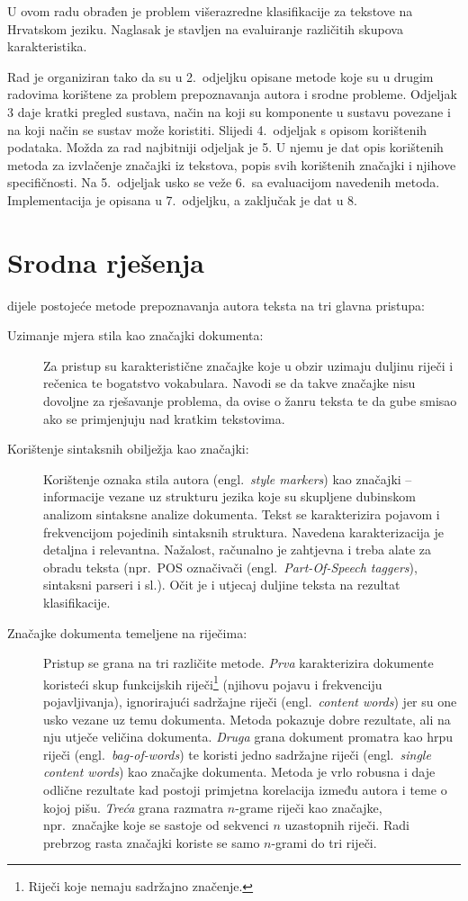 \documentclass{article}
\newcommand{\engl}[1]{(engl.~\emph{#1})}
\begin{document}
U ovom radu obrađen je problem višerazredne klasifikacije za tekstove na
Hrvatskom jeziku. Naglasak je stavljen na evaluiranje različitih skupova
karakteristika.

Rad je organiziran tako da su u 2.~odjeljku opisane metode koje su u drugim
radovima korištene za problem prepoznavanja autora i srodne probleme. Odjeljak 3
daje kratki pregled sustava, način na koji su komponente u sustavu povezane i na
koji način se sustav može koristiti. Slijedi 4.~odjeljak s opisom korištenih
podataka. Možda za rad najbitniji odjeljak je 5. U njemu je dat opis korištenih
metoda za izvlačenje značajki iz tekstova, popis svih korištenih značajki i
njihove specifičnosti. Na 5.~odjeljak usko se veže 6.~sa evaluacijom navedenih
metoda. Implementacija je opisana u 7.~odjeljku, a zaključak je dat u 8.
 
\section{Srodna rješenja}
\citet{coyotl2006authorship} dijele postojeće metode prepoznavanja autora
teksta na tri glavna pristupa:
\begin{description}
\item[Uzimanje mjera stila kao značajki dokumenta:] Za pristup su
karakteristične značajke koje u obzir uzimaju duljinu riječi i rečenica te
bogatstvo vokabulara. Navodi se da takve značajke nisu dovoljne za rješavanje
problema, da ovise o žanru teksta te da gube smisao ako se primjenjuju nad
kratkim tekstovima.
\item[Korištenje sintaksnih obilježja kao značajki:] Korištenje oznaka stila
autora \engl{style markers} kao značajki -- informacije vezane uz strukturu
jezika koje su skupljene dubinskom analizom sintaksne analize dokumenta. Tekst se
karakterizira pojavom i frekvencijom pojedinih sintaksnih struktura. Navedena
karakterizacija je detaljna i relevantna. Nažalost, računalno je zahtjevna i
treba alate za obradu teksta (npr.~POS označivači \engl{Part-Of-Speech taggers},
sintaksni parseri i sl.). Očit je i utjecaj duljine teksta na rezultat klasifikacije.
\item[Značajke dokumenta temeljene na riječima:] Pristup se grana na tri
različite metode. \emph{Prva} karakterizira dokumente koristeći skup funkcijskih
riječi\footnote{Riječi koje nemaju sadržajno značenje.} (njihovu pojavu i
frekvenciju pojavljivanja), ignorirajući sadržajne riječi \engl{content words}
jer su one usko vezane uz temu dokumenta. Metoda pokazuje dobre rezultate, ali na
nju utječe veličina dokumenta. \emph{Druga} grana dokument promatra kao hrpu
riječi \engl{bag-of-words} te koristi jedno sadržajne riječi \engl{single content
words} kao značajke dokumenta. Metoda je vrlo robusna i daje odlične rezultate
kad postoji primjetna korelacija između autora i teme o kojoj pišu. \emph{Treća}
grana razmatra $n$-grame riječi kao značajke, npr.~značajke koje se sastoje od
sekvenci $n$ uzastopnih riječi. Radi prebrzog rasta značajki koriste se samo
$n$-grami do tri riječi.
\end{description}
\end{document}
